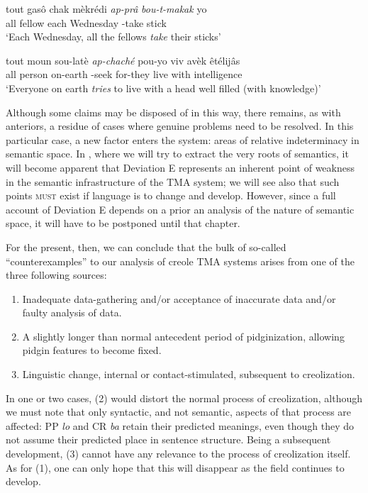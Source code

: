 \ea\label{ex:2:123}
 \gll tout gasô chak mèkrédi \emph{ap-prâ} \emph{bou-t-makak} yo\\
all fellow each Wednesday \ASP-take stick {\PL}\\
\glt `Each Wednesday, all the fellows \textit{take} their sticks'
\z

\ea\label{ex:2:124}
\gll tout moun sou-latè \emph{ap-chaché} pou-yo viv avèk êtélijâs\\
all person on-earth \ASP-seek for-they live with intelligence\\
\glt `Everyone on earth \textit{tries} to live with a head well filled (with knowledge)'
\z

Although some claims may be disposed of in this way, there remains, as with anteriors, a residue of cases where genuine problems need to be resolved. In this particular case, a new factor enters the system: areas of relative indeterminacy in semantic space. In , where we will try to extract the very roots of semantics, it will become apparent that Deviation E represents an inherent point of weakness in the semantic infrastructure of the TMA system; we will see also that such points \textsc{must} exist if language is to change and develop. However, since a full account of Deviation E depends on a prior an analysis of the nature of semantic space, it will have to be postponed until that chapter.

For the present, then, we can conclude that the bulk of so-called ``counterexamples'' to our analysis of creole TMA systems arises from one of the three following sources:

\begin{enumerate}
\item Inadequate data-gathering and/or acceptance of inaccurate data and/or faulty analysis of data.
\item A slightly longer than normal antecedent period of pidginization, allowing pidgin features to become fixed.
\item Linguistic change, internal or contact-stimulated, subsequent to creolization.
\end{enumerate}
In one or two cases, (2) would distort the normal process of creolization, although we must note that only syntactic, and not semantic, aspects of that process are affected: PP \textit{lo} and CR \textit{ba} retain their predicted meanings, even though they do not assume their predicted place in sentence structure. Being a subsequent development, (3) cannot have any relevance to the process of creolization itself. As for (1), one can only hope that this will disappear as the field continues to develop.\\\\

